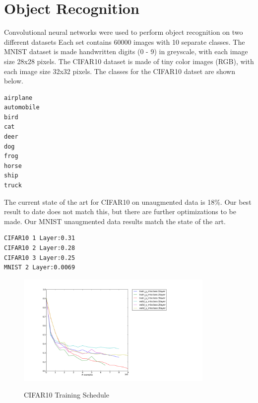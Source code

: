 \documentclass{article}
\begin{document}
\section*{Object Recognition}
Convolutional neural networks were used to perform object recognition on two different datasets
Each set contains 60000 images with 10 separate classes.
The MNIST dataset is made handwritten digits (0 - 9) in greyscale, with each image size 28x28 pixels.
The CIFAR10 dataset is made of tiny color images (RGB), with each image size 32x32 pixels. The classes 
for the CIFAR10 datset are shown below.
\vspace*{1\baselineskip}      
\begin{verbatim}
airplane
automobile
bird
cat
deer
dog
frog
horse
ship
truck
\end{verbatim}
\vspace*{1\baselineskip}      
The current state of the art for CIFAR10 on unaugmented data is 18\%. Our best result to date
does not match this, but there are further optimizations to be made. Our MNIST unaugmented data results match the state of the art.
\vspace*{1\baselineskip}      
\begin{verbatim}
CIFAR10 1 Layer:0.31
CIFAR10 2 Layer:0.28
CIFAR10 3 Layer:0.25
MNIST 2 Layer:0.0069
\end{verbatim}
\vspace*{1\baselineskip}      
\begin{figure}[h!]
    \caption{CIFAR10 Training Schedule}
  \centering
    \includegraphics[width=0.85\textwidth]{figure_3.png}
  \label{fig:f3}
\end{figure}
\end{document}
